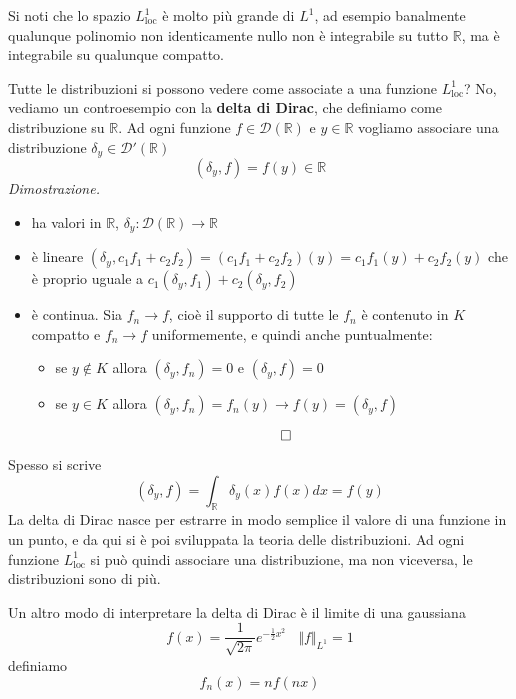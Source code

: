 Si noti che lo spazio $L^{1}_{\mathrm{loc}}$ è molto più grande di $L^{1}$, ad esempio banalmente qualunque polinomio non identicamente nullo non è integrabile su tutto $\mathbb{R}$, ma è integrabile su qualunque compatto.

Tutte le distribuzioni si possono vedere come associate a una funzione $L^{1}_{\mathrm{loc}}$? No, vediamo un controesempio con la \textbf{delta di Dirac}, che definiamo come distribuzione su $\mathbb{R}$. Ad ogni funzione $f\in \mathcal{D}(\mathbb{R})$ e $y\in \mathbb{R}$ vogliamo associare una distribuzione $\delta _{y} \in \mathcal{D} '(\mathbb{R})$
\begin{equation*}
\boxed{( \delta _{y} ,f) =f( y) \in \mathbb{R}}
\end{equation*}
\textit{Dimostrazione.}
\begin{itemize}
\item ha valori in $\mathbb{R}$, $\delta _{y} :\mathcal{D}(\mathbb{R})\rightarrow \mathbb{R}$
\item è lineare $( \delta _{y} ,c_{1} f_{1} +c_{2} f_{2}) =( c_{1} f_{1} +c_{2} f_{2})( y) =c_{1} f_{1}( y) +c_{2} f_{2}( y)$ che è proprio uguale a $c_{1}( \delta _{y} ,f_{1}) +c_{2}( \delta _{y} ,f_{2})$
\item è continua. Sia $f_{n}\rightarrow f$, cioè il supporto di tutte le $f_{n}$ è contenuto in $K$ compatto e $f_{n}\rightarrow f$ uniformemente, e quindi anche puntualmente:
\begin{itemize}
\item se $y\notin K$ allora $( \delta _{y} ,f_{n}) =0$ e $( \delta _{y} ,f) =0$
\item se $y\in K$ allora $( \delta _{y} ,f_{n}) =f_{n}( y)\rightarrow f( y) =( \delta _{y} ,f)$
\end{itemize}

\begin{equation*}
\qed 
\end{equation*}
\end{itemize}
Spesso si scrive
\begin{equation*}
( \delta _{y} ,f) =\int _{\mathbb{R}} \delta _{y}( x) f( x) dx=f( y)
\end{equation*}
La delta di Dirac nasce per estrarre in modo semplice il valore di una funzione in un punto, e da qui si è poi sviluppata la teoria delle distribuzioni. Ad ogni funzione $L^{1}_{\mathrm{loc}}$ si può quindi associare una distribuzione, ma non viceversa, le distribuzioni sono di più.

Un altro modo di interpretare la delta di Dirac è il limite di una gaussiana
\begin{equation*}
f( x) =\frac{1}{\sqrt{2\pi }} e^{-\frac{1}{2} x^{2}} \ \ \ \ \Vert f\Vert _{L^{1}} =1
\end{equation*}
definiamo
\begin{equation*}
f_{n}( x) =nf( nx)
\end{equation*}

